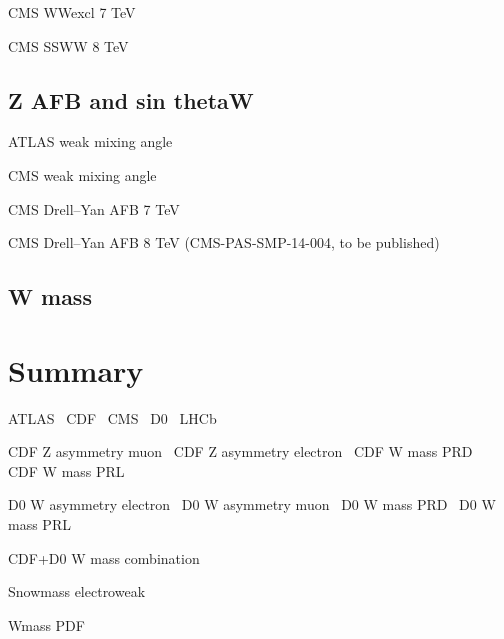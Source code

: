 \documentclass[12pt]{iopart}
\begin{document}
CMS WWexcl 7 TeV~\cite{Chatrchyan:2013foa}

CMS SSWW 8 TeV~\cite{Khachatryan:2014sta}

\subsection{Z AFB and sin thetaW}

ATLAS weak mixing angle~\cite{Aad:2015uau}

CMS weak mixing angle~\cite{Chatrchyan:2011ya}

CMS Drell--Yan AFB 7 TeV~\cite{Chatrchyan:2012dc}

CMS Drell--Yan AFB 8 TeV (CMS-PAS-SMP-14-004, to be published)

\subsection{W mass}


\section{Summary}


ATLAS~\cite{Aad:2008zzm}
CDF~\cite{Abulencia:2005ix}
CMS~\cite{CMSdetector}
D0~\cite{Abazov:2005pn}
LHCb~\cite{Alves:2008zz}

CDF Z asymmetry muon~\cite{Aaltonen:2014loa}
CDF Z asymmetry electron~\cite{Aaltonen:2013wcp}
CDF W mass PRD~\cite{Aaltonen:2013vwa}
CDF W mass PRL~\cite{Aaltonen:2012bp}

D0 W asymmetry electron~\cite{Abazov:2013dsa}
D0 W asymmetry muon~\cite{Abazov:2013rja}
D0 W mass PRD~\cite{D0:2013jba}
D0 W mass PRL~\cite{Abazov:2012bv}

CDF+D0 W mass combination~\cite{Aaltonen:2013iut}

Snowmass electroweak~\cite{Baak:2013fwa}

Wmass PDF~\cite{Bozzi:2011ww}



\end{document}
